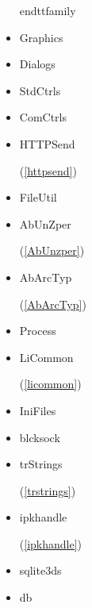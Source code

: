 \documentclass{report}
\begin{document}
\begin{itemize}
end{ttfamily}\item \begin{ttfamily}Graphics\end{ttfamily}\item \begin{ttfamily}Dialogs\end{ttfamily}\item \begin{ttfamily}StdCtrls\end{ttfamily}\item \begin{ttfamily}ComCtrls\end{ttfamily}\item \begin{ttfamily}HTTPSend\end{ttfamily}(\ref{httpsend})\item \begin{ttfamily}FileUtil\end{ttfamily}\item \begin{ttfamily}AbUnZper\end{ttfamily}(\ref{AbUnzper})\item \begin{ttfamily}AbArcTyp\end{ttfamily}(\ref{AbArcTyp})\item \begin{ttfamily}Process\end{ttfamily}\item \begin{ttfamily}LiCommon\end{ttfamily}(\ref{licommon})\item \begin{ttfamily}IniFiles\end{ttfamily}\item \begin{ttfamily}blcksock\end{ttfamily}\item \begin{ttfamily}trStrings\end{ttfamily}(\ref{trstrings})\item \begin{ttfamily}ipkhandle\end{ttfamily}(\ref{ipkhandle})\item \begin{ttfamily}sqlite3ds\end{ttfamily}\item \begin{ttfamily}db\end{ttfamily}\end{itemize}
\end{document}
